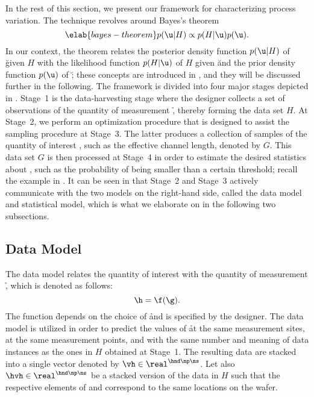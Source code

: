 In the rest of this section, we present our framework for characterizing process
variation. The technique revolves around Bayes's theorem \cite{gelman2013}
\begin{equation} \elab{bayes-theorem}
  p(\u | H) \propto p(H | \u) p(\u).
\end{equation}
In our context, the theorem relates the posterior density function $p(\u |H)$ of
\u given $H$ with the likelihood function $p(H | \u)$ of $H$ given \u and the
prior density function $p(\u)$ of \u; these concepts are introduced in
, and they will be discussed further in the following.
The framework is divided into four major stages depicted in
. Stage~1 is the data-harvesting stage where the designer
collects a set of observations of the quantity of measurement \h, thereby
forming the data set $H$. At Stage~2, we perform an optimization procedure that
is designed to assist the sampling procedure at Stage~3. The latter produces a
collection of samples of the quantity of interest \g, such as the effective
channel length, denoted by $G$. This data set $G$ is then processed at Stage~4
in order to estimate the desired statistics about \g, such as the probability of
\g being smaller than a certain threshold; recall the example in
. It can be seen in  that Stage~2
and Stage~3 actively communicate with the two models on the right-hand side,
called the data model and statistical model, which is what we elaborate on in
the following two subsections.

\subsection{Data Model}

The data model relates the quantity of interest \g with the quantity of
measurement \h, which is denoted as follows:
\[
  \h = \f(\g).
\]
The function \f depends on the choice of \h and is specified by the designer.
The data model is utilized in order to predict the values of \h at the same
measurement sites, at the same measurement points, and with the same number and
meaning of data instances as the ones in $H$ obtained at Stage~1. The resulting
data are stacked into a single vector denoted by $\vh \in \real^{\hnd \np \ns}$.
Let also $\hvh \in \real^{\hnd \np \ns}$ be a stacked version of the data in $H$
such that the respective elements of \vh and \hvh correspond to the same
locations on the wafer.

